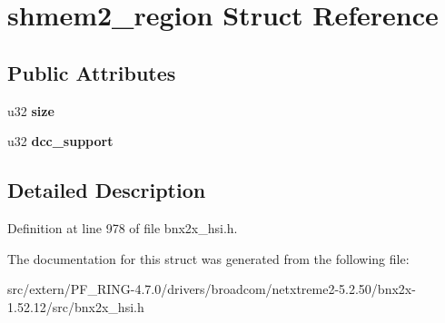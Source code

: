 \hypertarget{structshmem2__region}{
\section{shmem2\_\-region Struct Reference}
\label{structshmem2__region}
}
\subsection*{Public Attributes}
\begin{DoxyCompactItemize}
\item 
\hypertarget{structshmem2__region_a655e8b482d06499f1ec5665ebbb80998}{
u32 {\bfseries size}}
\label{structshmem2__region_a655e8b482d06499f1ec5665ebbb80998}

\item 
\hypertarget{structshmem2__region_a766f8e4893f01bad1cc5df5543129e14}{
u32 {\bfseries dcc\_\-support}}
\label{structshmem2__region_a766f8e4893f01bad1cc5df5543129e14}

\end{DoxyCompactItemize}


\subsection{Detailed Description}


Definition at line 978 of file bnx2x\_\-hsi.h.



The documentation for this struct was generated from the following file:\begin{DoxyCompactItemize}
\item 
src/extern/PF\_\-RING-\/4.7.0/drivers/broadcom/netxtreme2-\/5.2.50/bnx2x-\/1.52.12/src/bnx2x\_\-hsi.h\end{DoxyCompactItemize}
